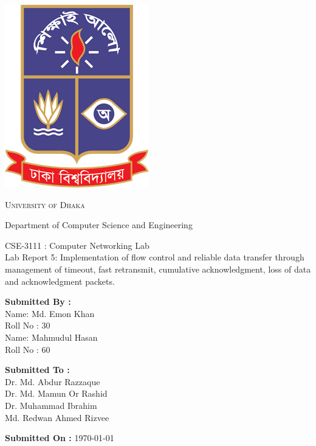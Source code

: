 \documentclass[11pt]{article}
\newcommand{\labNo}{5}
\newcommand{\labTitle}{Implementation of flow control and reliable data transfer through management of
timeout, fast retransmit, cumulative acknowledgment, loss of data and acknowledgment packets.}
\begin{document}
\begin{titlepage}
    \begin{center}
        \includegraphics[scale=0.35]{du_logo.png}\par
        \begin{Huge}
            \textsc{University of Dhaka}\par
        \end{Huge}
        \begin{Large}
            Department of Computer Science and Engineering\par \vspace{1cm}
            CSE-3111 : Computer Networking Lab \\[12pt]    
            Lab Report \labNo : \labTitle
        \end{Large}
    \end{center}
    
    \vfill
    
    \begin{large}
        \begin{multicols}{2}
            \textbf{Submitted By :\\[12pt]}
                Name: Md. Emon Khan\\[8pt]
                Roll No : 30\\[12pt]
                Name: Mahmudul Hasan\\[8pt]
                Roll No : 60\\[12pt]
                
            \columnbreak
            
            \noindent
            \textbf{Submitted To :\\[12pt]}
                Dr. Md. Abdur Razzaque\\[12pt]
                Dr. Md. Mamun Or Rashid\\[12pt]
                Dr. Muhammad Ibrahim\\[12pt]
                Md. Redwan Ahmed Rizvee
        \end{multicols}
    \end{large} 
    
\textbf{Submitted On :} \today\\[20pt]

\end{titlepage}
\tableofcontents
\newpage
\end{document}
